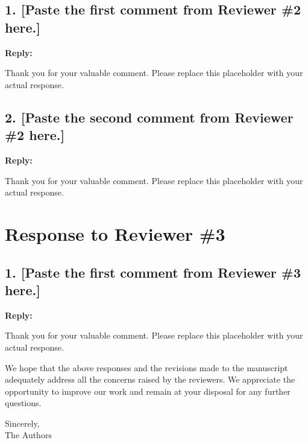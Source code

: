 \documentclass[11pt,a4paper,fontset=none]{ctexart}
\makeatletter
\newcommand{\defref}[2]{%
  \expandafter\gdef\csname ref@#1\endcsname{#2}%
}
\DeclareRobustCommand{\rcite}[1]{%
  \ifcsname ref@#1\endcsname
    \immediate\write\refcheck@stream{Defined: #1}%
    \textbf{\csname ref@#1\endcsname}%
  \else
    \immediate\write\refcheck@stream{UNDEFINED REF: #1}%
    \PackageError{response letter}{Undefined reference '#1' — add \string\defref\{#1\}\{...\} to reference table}{}%
  \fi
}
\newenvironment{reply}{%
  \par\vspace{2pt}%
  \color{replyblue}%
  \noindent\textbf{Reply:} %
  \ignorespaces
}{\par\vspace{2pt}}
\makeatother
\begin{document}
\subsection*{1. [Paste the first comment from Reviewer \#2 here.]}

\begin{reply}
Thank you for your valuable comment. Please replace this placeholder with your actual response.
\end{reply}

\subsection*{2. [Paste the second comment from Reviewer \#2 here.]}

\begin{reply}
Thank you for your valuable comment. Please replace this placeholder with your actual response.
\end{reply}


\section*{Response to Reviewer \#3}

\subsection*{1. [Paste the first comment from Reviewer \#3 here.]}

\begin{reply}
Thank you for your valuable comment. Please replace this placeholder with your actual response.
\end{reply}




\bigskip
\noindent We hope that the above responses and the revisions made to the manuscript adequately address all the concerns raised by the reviewers. We appreciate the opportunity to improve our work and remain at your disposal for any further questions.

\bigskip
\noindent Sincerely,\\[1.5em]
\noindent The Authors
\end{document}

